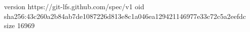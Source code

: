 version https://git-lfs.github.com/spec/v1
oid sha256:43c260a2b84ab7de1087226d813e8c1a046ea129421146977e33c72c5a2eefdc
size 16969

